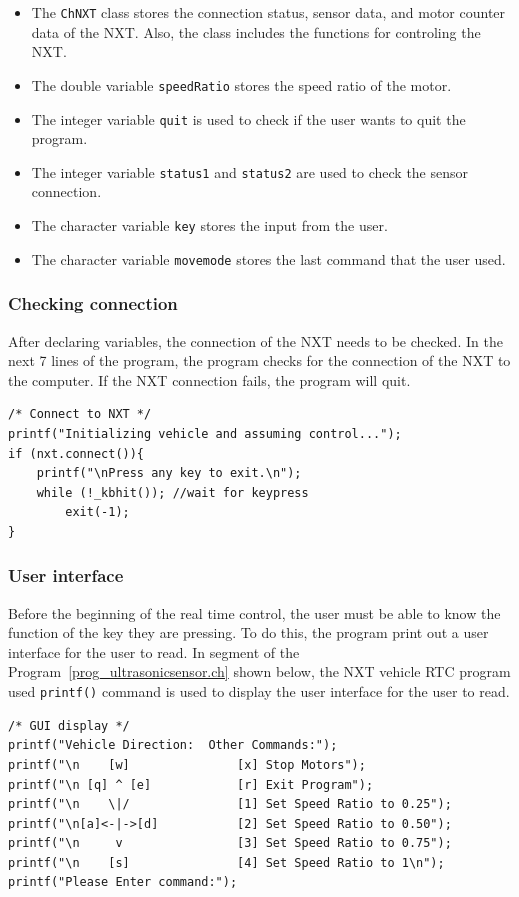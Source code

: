 \documentclass[11pt]{article}
\begin{document}
\begin{itemize}
\item The \verb+ChNXT+ class stores the connection status, sensor data, and motor counter data of the
    NXT. Also, the class includes the functions for controling the NXT.
\item The double variable \verb+speedRatio+ stores the speed ratio of the motor.
\item The integer variable \verb+quit+ is used to check if the user wants to quit the program.
\item The integer variable \verb+status1+ and \verb+status2+ are used to check the sensor connection.
\item The character variable \verb+key+ stores the input from the user.
\item The character variable \verb+movemode+ stores the last command that the user used.
\end{itemize}

\subsubsection*{Checking connection}
After declaring variables, the connection of the NXT needs to be checked.
In the next 7 lines of the program, the program checks for the connection of the NXT to the computer.
If the NXT connection fails, the program will quit.

\begin{verbatim}
/* Connect to NXT */
printf("Initializing vehicle and assuming control...");
if (nxt.connect()){
    printf("\nPress any key to exit.\n");
    while (!_kbhit()); //wait for keypress
        exit(-1);
}
\end{verbatim}

\subsubsection*{User interface}
Before the beginning of the real time control, the user must be able to know the function of the key 
they are pressing. To do this, the program print out a user interface for the user to read. 
In segment of the Program~\ref{prog_ultrasonicsensor.ch} shown below, the NXT vehicle RTC program used \verb+printf()+ command is 
used to display the user interface for the user to read.
\begin{verbatim}
/* GUI display */
printf("Vehicle Direction:  Other Commands:");
printf("\n    [w]               [x] Stop Motors");
printf("\n [q] ^ [e]            [r] Exit Program");
printf("\n    \|/               [1] Set Speed Ratio to 0.25");
printf("\n[a]<-|->[d]           [2] Set Speed Ratio to 0.50");
printf("\n     v                [3] Set Speed Ratio to 0.75");
printf("\n    [s]               [4] Set Speed Ratio to 1\n");
printf("Please Enter command:");
\end{verbatim}
\end{document}
